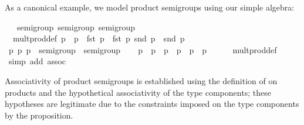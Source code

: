 \begin{isabellebody}
\begin{isamarkuptext}
  As a canonical example, we model product semigroups
  using our simple algebra:%
\end{isamarkuptext}%
\isamarkuptrue%
%
\isadelimquote
%
\endisadelimquote
%
\isatagquote
{}\isamarkupfalse%
\ {\isacharasterisk}\ {\isacharcolon}{\isacharcolon}\ {\isacharparenleft}semigroup{\isacharcomma}\ semigroup{\isacharparenright}\ semigroup\isanewline
{}\isanewline
\isanewline
{}\isamarkupfalse%
\isanewline
\ \ mult{\isacharunderscore}prod{\isacharunderscore}def{\isacharcolon}\ {\isachardoublequoteopen}p\ {\isasymotimes}\ p\ {\isacharequal}\ {\isacharparenleft}fst\ p\ {\isasymotimes}\ fst\ p\ snd\ p\ {\isasymotimes}\ snd\ p\isanewline
\isanewline
{}\isamarkupfalse%
\ \isamarkupfalse%
\isanewline
\ \ \isamarkupfalse%
\ p\ p\ p\ {\isacharcolon}{\isacharcolon}\ {\isachardoublequoteopen}{\isasymalpha}{\isasymColon}semigroup\ {\isasymtimes}\ {\isasymbeta}{\isasymColon}semigroup{\isachardoublequoteclose}\isanewline
\ \ \isamarkupfalse%
\ {\isachardoublequoteopen}p\ {\isasymotimes}\ p\ {\isasymotimes}\ p\ {\isacharequal}\ p\ {\isasymotimes}\ {\isacharparenleft}p\ {\isasymotimes}\ p\isanewline
\ \ \ \ \isamarkupfalse%
\ mult{\isacharunderscore}prod{\isacharunderscore}def\ \isamarkupfalse%
\ {\isacharparenleft}simp\ add{\isacharcolon}\ assoc{\isacharparenright}\isanewline
{}\isamarkupfalse%
\ \ \ \ \ \ \isanewline
\isanewline
{}\isamarkupfalse%
%
\endisatagquote
{\isafoldquote}%
%
\isadelimquote
%
\endisadelimquote
%
\begin{isamarkuptext}%
\noindent Associativity of product semigroups is established using
  the definition of \isa{{\isacharparenleft}{\isasymotimes}{\isacharparenright}} on products and the hypothetical
  associativity of the type components;  these hypotheses
  are legitimate due to the  constraints imposed
  on the type components by the \hyperlink{command.instance}{\mbox{}} proposition.

\end{isamarkuptext}
\end{isabellebody}
